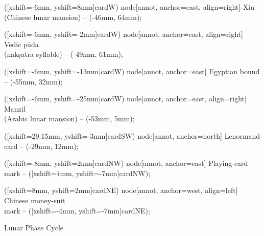 \documentclass{article}
\begin{document}
\begin{center}
{  %
    ([xshift=-6mm, yshift=8mm]cardW) node[annot, anchor=east, align=right] {Xiu\\(Chinese lunar mansion)}
    -- (-46mm, 64mm);

    ([xshift=-6mm, yshift=-2mm]cardW) node[annot, anchor=east, align=right] {Vedic pāda\\(nakṣatra syllable)}
    -- (-49mm, 61mm);

    ([xshift=-6mm, yshift=-13mm]cardW) node[annot, anchor=east] {Egyptian bound}
    -- (-55mm, 32mm);

    ([xshift=-6mm, yshift=-25mm]cardW) node[annot, anchor=east, align=right] {Manzil\\(Arabic lunar mansion)}
    -- (-53mm, 5mm);

    ([xshift=29.15mm, yshift=-3mm]cardSW) node[annot, anchor=north] {Lenormand card}
    -- (-29mm, 12mm);

    ([xshift=-8mm, yshift=2mm]cardNW) node[annot, anchor=east] {Playing-card mark}
    -- ([xshift=4mm, yshift=-7mm]cardNW);

    ([xshift=8mm, yshift=2mm]cardNE) node[annot, anchor=west, align=left] {Chinese money-suit\\mark}
    -- ([xshift=-4mm, yshift=-7mm]cardNE);
}
\end{center}

\restoregeometry
\newpage


\begin{center}
{\cardfont\fontsize{18}{22}\selectfont Lunar Phase Cycle}
\end{center}

\vspace{12mm}
\end{document}
